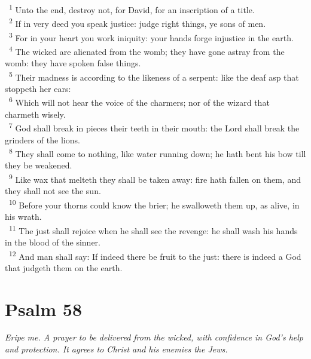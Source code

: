 \documentclass[a5paper,12pt]{article}
\begin{document}
\begin{multicols*}{2}
~\textsuperscript{1} Unto the end, destroy not, for David, for an inscription of a title.\\
~\textsuperscript{2} If in very deed you speak justice: judge right things, ye sons of men.\\
~\textsuperscript{3} For in your heart you work iniquity: your hands forge injustice in the earth.\\
~\textsuperscript{4} The wicked are alienated from the womb; they have gone astray from the womb: they have spoken false things.\\
~\textsuperscript{5} Their madness is according to the likeness of a serpent: like the deaf asp that stoppeth her ears:\\
~\textsuperscript{6} Which will not hear the voice of the charmers; nor of the wizard that charmeth wisely.\\
~\textsuperscript{7} God shall break in pieces their teeth in their mouth: the Lord shall break the grinders of the lions.\\
~\textsuperscript{8} They shall come to nothing, like water running down; he hath bent his bow till they be weakened.\\
~\textsuperscript{9} Like wax that melteth they shall be taken away: fire hath fallen on them, and they shall not see the sun.\\
~\textsuperscript{10} Before your thorns could know the brier; he swalloweth them up, as alive, in his wrath.\\
~\textsuperscript{11} The just shall rejoice when he shall see the revenge: he shall wash his hands in the blood of the sinner.\\
~\textsuperscript{12} And man shall say: If indeed there be fruit to the just: there is indeed a God that judgeth them on the earth.\\

\section{Psalm 58}
\label{sec:org874e851}
\emph{Eripe me. A prayer to be delivered from the wicked, with confidence in God's help and protection. It agrees to Christ and his enemies the Jews.}\\


\end{multicols*}
\end{document}
